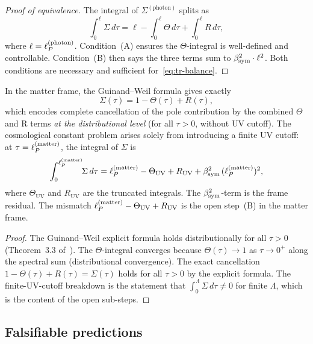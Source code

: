 \begin{proof}[Proof of equivalence]
The integral of $\Sigma^{(\mathrm{photon})}$ splits as
\[
 \int_0^{\ell} \Sigma\,d\tau
 = \ell - \int_0^\ell \Theta\,d\tau + \int_0^\ell R\,d\tau,
\]
where $\ell = \ell_P^{(\mathrm{photon})}$.
Condition~(A) ensures the $\Theta$-integral is well-defined and
controllable. Condition~(B) then says the three terms sum to
$\beta_{\mathrm{sym}}^2\cdot\ell^2$.
Both conditions are necessary and sufficient for~\eqref{eq:tr-balance}.
\end{proof}

\begin{theorem}
\label{thm:partial-cancel}
In the matter frame, the Guinand--Weil formula gives exactly
\[
 \Sigma(\tau) = 1 - \Theta(\tau) + R(\tau),
\]
which encodes complete cancellation of the pole contribution by the
combined $\Theta$ and R terms \emph{at the distributional level} (for all
$\tau > 0$, without UV cutoff). The cosmological constant problem
arises solely from introducing a finite UV cutoff: at
$\tau = \ell_P^{(\mathrm{matter})}$, the integral of $\Sigma$ is
\[
 \int_0^{\ell_P^{(\mathrm{matter})}}\!\!\Sigma\,d\tau
 = \ell_P^{(\mathrm{matter})} - \Theta_{\mathrm{UV}}
 + R_{\mathrm{UV}} + \beta_{\mathrm{sym}}^2\,(\ell_P^{(\mathrm{matter})})^2,
\]
where $\Theta_{\mathrm{UV}}$ and $R_{\mathrm{UV}}$ are the truncated
integrals. The $\beta_{\mathrm{sym}}^2$-term is the frame residual. The mismatch
$\ell_P^{(\mathrm{matter})} - \Theta_{\mathrm{UV}} + R_{\mathrm{UV}}$
is the open step~(B) in the matter frame.
\end{theorem}

\begin{proof}
The Guinand--Weil explicit formula holds distributionally for all
$\tau > 0$ (Theorem~3.3 of~\cite{brendecke2026rh}). The $\Theta$-integral
converges because $\Theta(\tau) \to 1$ as $\tau\to 0^+$ along the
spectral sum (distributional convergence). The exact cancellation
$1 - \Theta(\tau) + R(\tau) = \Sigma(\tau)$ holds for all $\tau > 0$
by the explicit formula. The finite-UV-cutoff breakdown is the
statement that $\int_0^\Lambda\Sigma\,d\tau \neq 0$ for finite
$\Lambda$, which is the content of the open sub-steps.
\end{proof}

\subsection{Falsifiable predictions}
\label{sec:falsifiable}

